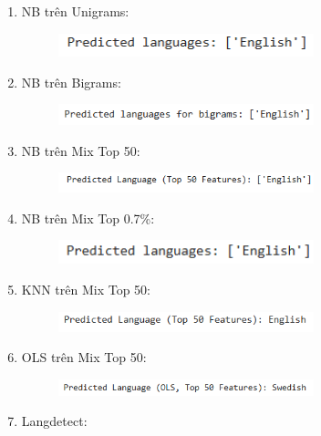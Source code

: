 \begin{enumerate}
    \item NB trên Unigrams:
    \begin{figure}[H]
    \centering
    \includegraphics[width=0.7\textwidth]{img/docspics/Picture86.png}
\end{figure}
    \item NB trên Bigrams:
    \begin{figure}[H]
    \centering
    \includegraphics[width=0.7\textwidth]{img/docspics/Picture87.png}
\end{figure}
    \item NB trên Mix Top 50:
    \begin{figure}[H]
    \centering
    \includegraphics[width=0.7\textwidth]{img/docspics/Picture88.png}
\end{figure}
    \item NB trên Mix Top 0.7\%:
    \begin{figure}[H]
    \centering
    \includegraphics[width=0.7\textwidth]{img/docspics/Picture89.png}
\end{figure}
    \item KNN trên Mix Top 50:
    \begin{figure}[H]
    \centering
    \includegraphics[width=0.7\textwidth]{img/docspics/Picture90.png}
\end{figure}
    \item OLS trên Mix Top 50:
    \begin{figure}[H]
    \centering
    \includegraphics[width=0.7\textwidth]{img/docspics/Picture91.png}
\end{figure}
    \item Langdetect:

\end{enumerate}
